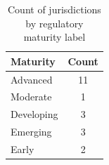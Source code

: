 \begin{table}[htbp]
\centering
\caption{Count of jurisdictions by regulatory maturity label}
\label{tab:maturity-counts}
\begin{tabular}{@{}lc@{}}
\toprule
\textbf{Maturity} & \textbf{Count} \\
\midrule
Advanced & 11 \\
Moderate & 1 \\
Developing & 3 \\
Emerging & 3 \\
Early & 2 \\
\bottomrule
\end{tabular}
\end{table}
